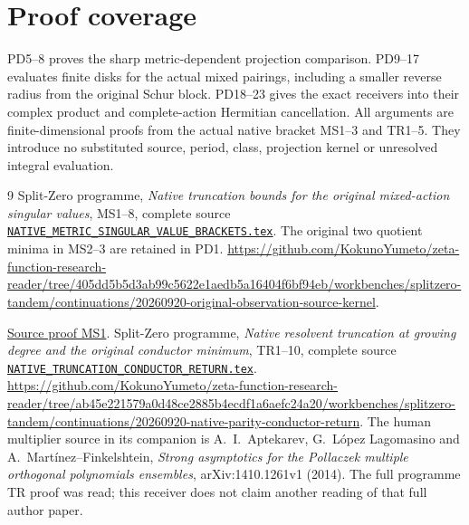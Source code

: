 \documentclass[11pt]{article}
\begin{document}
\section{Proof coverage}
PD5--8 proves the sharp metric-dependent projection comparison.
PD9--17 evaluates finite disks for the actual mixed pairings,
including a smaller reverse radius from the original Schur block.
PD18--23 gives the exact receivers into their complex product and
complete-action Hermitian cancellation.  All arguments are
finite-dimensional proofs from the actual native bracket MS1--3
and TR1--5.  They introduce no substituted source, period, class,
projection kernel or unresolved integral evaluation.
\begin{thebibliography}{9}
 Split-Zero programme,
\emph{Native truncation bounds for the original mixed-action singular values},
MS1--8, complete source \href{https://github.com/KokunoYumeto/zeta-function-research-reader/blob/5992ad50c0f2a06921f1fcaded7b4e38097c0739/workbenches/splitzero-tandem/continuations/20260920-original-kernel-mixed-determinants/providers/NATIVE_METRIC_SINGULAR_VALUE_BRACKETS.tex\#L1}{\texttt{NATIVE\_METRIC\_SINGULAR\_VALUE\_BRACKETS.tex}}.
The original two quotient minima in MS2--3 are retained in PD1.
\url{https://github.com/KokunoYumeto/zeta-function-research-reader/tree/405dd5b5d3ab99c5622e1aedb5a16404f6bf94eb/workbenches/splitzero-tandem/continuations/20260920-original-observation-source-kernel}.

\href{https://github.com/KokunoYumeto/zeta-function-research-reader/blob/5992ad50c0f2a06921f1fcaded7b4e38097c0739/workbenches/splitzero-tandem/continuations/20260920-original-kernel-mixed-determinants/providers/NATIVE_METRIC_SINGULAR_VALUE_BRACKETS.tex\#L25}{Source proof MS1}.
 Split-Zero programme,
\emph{Native resolvent truncation at growing degree and the original conductor minimum},
TR1--10, complete source \href{https://github.com/KokunoYumeto/zeta-function-research-reader/blob/5992ad50c0f2a06921f1fcaded7b4e38097c0739/workbenches/splitzero-tandem/continuations/20260920-original-kernel-mixed-determinants/providers/NATIVE_TRUNCATION_CONDUCTOR_RETURN.tex\#L1}{\texttt{NATIVE\_TRUNCATION\_CONDUCTOR\_RETURN.tex}}.
\url{https://github.com/KokunoYumeto/zeta-function-research-reader/tree/ab45e221579a0d48ce2885b4ecdf1a6aefc24a20/workbenches/splitzero-tandem/continuations/20260920-native-parity-conductor-return}.
The human multiplier source in its companion is A.~I.~Aptekarev,
G.~L\'opez Lagomasino and A.~Mart\'inez--Finkelshtein,
\emph{Strong asymptotics for the Pollaczek multiple orthogonal polynomials ensembles},
arXiv:1410.1261v1 (2014). The full programme TR proof was read;
this receiver does not claim another reading of that full author paper.


\end{thebibliography}
\end{document}

